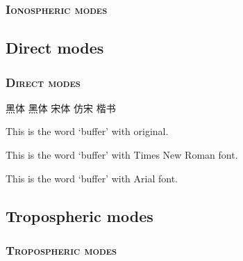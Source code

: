 \documentclass[aspectratio=169, 10pt, utf8, mathserif]{beamer}
\numberwithin{equation}{section} %
\numberwithin{figure}{section} %
\begin{document}
\begin{frame}
\frametitle{\textsc{Ionospheric modes}}


\end{frame}

\subsection[Direct modes (line-of-sight) 视距传播]{Direct modes}\label{subsec:6-4}

\begin{frame}
\frametitle{\textsc{Direct modes}}
黑体
\heiti 黑体
\songti 宋体
\fangsong 仿宋
\kaishu 楷书

\rmfamily This is the word `buffer' with original.

\setmainfont{Times New Roman}
This is the word `buffer' with Times New Roman font.

\setmainfont{Arial}
This is the word `buffer' with Arial font.

\end{frame}


\subsection[Tropospheric modes 对流层散射传播]{Tropospheric modes}\label{subsec:6-5}

\begin{frame}
\frametitle{\textsc{Tropospheric modes}}


\end{frame}


\begin{frame}
\end{frame}
\end{document}
